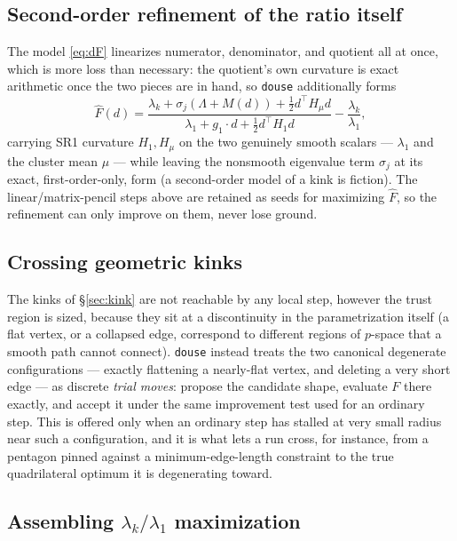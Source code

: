 \documentclass[11pt]{article}
\newcommand{\code}[1]{\texttt{#1}}
\theoremstyle{plain}
\begin{document}
\subsection{Second-order refinement of the ratio itself}

The model \eqref{eq:dF} linearizes numerator, denominator, and quotient all at once, which is more
loss than necessary: the quotient's own curvature is exact arithmetic once the two pieces are in
hand, so \code{douse} additionally forms
\[
  \widehat F(d)=\frac{\lambda_k+\sigma_j(\Lambda+M(d))+\tfrac12 d^\top H_\mu d}
                     {\lambda_1+g_1\cdot d+\tfrac12 d^\top H_1 d}-\frac{\lambda_k}{\lambda_1},
\]
carrying SR1 curvature $H_1,H_\mu$ on the two genuinely smooth scalars --- $\lambda_1$ and the
cluster mean $\mu$ --- while leaving the nonsmooth eigenvalue term $\sigma_j$ at its exact,
first-order-only, form (a second-order model of a kink is fiction). The linear/matrix-pencil steps
above are retained as seeds for maximizing $\widehat F$, so the refinement can only improve on them,
never lose ground.

\subsection{Crossing geometric kinks}

The kinks of \S\ref{sec:kink} are not reachable by any local step, however the trust region is
sized, because they sit at a discontinuity in the parametrization itself (a flat vertex, or a
collapsed edge, correspond to different regions of $p$-space that a smooth path cannot connect).
\code{douse} instead treats the two canonical degenerate configurations --- exactly flattening a
nearly-flat vertex, and deleting a very short edge --- as discrete \emph{trial moves}: propose the
candidate shape, evaluate $F$ there exactly, and accept it under the same improvement test used
for an ordinary step. This is offered only when an ordinary step has stalled at very small radius
near such a configuration, and it is what lets a run cross, for instance, from a pentagon pinned
against a minimum-edge-length constraint to the true quadrilateral optimum it is degenerating
toward.

\subsection{Assembling \texorpdfstring{$\lambda_k/\lambda_1$}{lambda\_k/lambda\_1} maximization}
\end{document}
